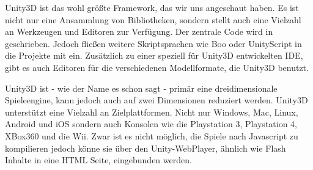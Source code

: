 Unity3D ist das wohl größte Framework, das wir uns angeschaut haben. Es ist nicht nur eine Ansammlung von Bibliotheken, sondern stellt auch eine Vielzahl an Werkzeugen und Editoren zur Verfügung. Der zentrale Code wird in \CS geschrieben. Jedoch fließen weitere Skriptsprachen wie Boo oder UnityScript in die Projekte mit ein.
Zusätzlich zu einer speziell für Unity3D entwickelten IDE, gibt es auch Editoren für die verschiedenen Modellformate, die Unity3D benutzt.

Unity3D ist - wie der Name es schon sagt - primär eine dreidimensionale Spieleengine, kann jedoch auch auf zwei Dimensionen reduziert werden.
Unity3D unterstützt eine Vielzahl an Zielplattformen. Nicht nur Windows, Mac, Linux, Android und iOS sondern auch Konsolen wie die Playstation 3, Playstation 4, XBox360 und die Wii. Zwar ist es nicht möglich, die Spiele nach Javascript zu kompilieren jedoch könne sie über den Unity-WebPlayer, ähnlich wie Flash Inhalte in eine HTML Seite, eingebunden werden.